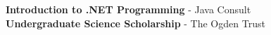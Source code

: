 \documentclass[9pt]{developercv} %
\begin{document}
    \hspace{26mm} \textbf{Introduction to .NET Programming} - Java Consult \\ 
    
    \hspace{26mm} \textbf{Undergraduate Science Scholarship} - The Ogden Trust



    

\
\end{document}
